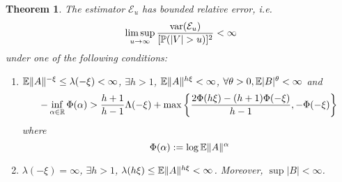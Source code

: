 \documentclass{article}
\newtheorem{theorem}{Theorem}
\theoremstyle{remark}
\begin{document}
\begin{theorem}
  The estimator $\mathcal E_u$ has bounded relative error, i.e.
  \begin{equation*}
    \limsup_{u \to \infty} {\text{var}(\mathcal E_u) \over [\mathbb{P}(|V| > u)]^2} < \infty
  \end{equation*}
  under one of the following conditions:
  \begin{enumerate}
  \item $\mathbb{E} \|A\|^{-\xi} \leq \lambda(-\xi) < \infty$, $\exists h > 1$,
    $\mathbb{E}\|A\|^{h\xi} < \infty$,
    $\forall \theta > 0, \mathbb{E} |B|^{\theta} < \infty$ and
    \begin{equation}
      \label{eq:deepness}
      -\inf_{\alpha \in \mathbb R} \Phi(\alpha)
      >
      {
        h+1
        \over
        h-1
      } \Lambda(-\xi)
      +
      \max\left\{
      {
        2 \Phi(h\xi) - (h+1) \Phi(-\xi)
        \over
        h-1
      },
      -\Phi(-\xi)
      \right\}
    \end{equation}
    where
    \[
    \Phi(\alpha) := \log \mathbb{E} \|A\|^{\alpha}
    \]
    \label{assumptions:1}
  \item $\lambda(-\xi) = \infty$, $\exists h > 1$,
    $\lambda(h\xi) \leq \mathbb{E}\|A\|^{h\xi} < \infty$. Moreover, $\sup |B|
    < \infty$.
  \end{enumerate}
\end{theorem}
\end{document}
